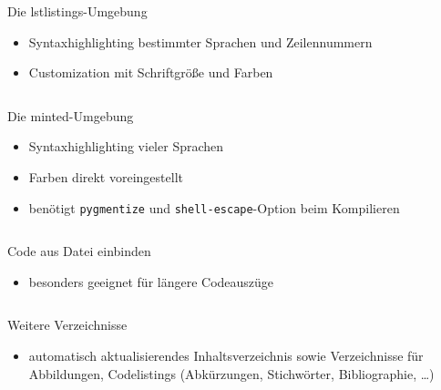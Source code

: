\documentclass[presentation,aspectratio=169]{beamer}
\begin{document}
\begin{frame}[fragile]{Die lstlistings-Umgebung}
  \begin{itemize}
    \item Syntaxhighlighting bestimmter Sprachen und Zeilennummern
    \item Customization mit Schriftgröße und Farben
  \end{itemize}
  \begin{minipage}{.4\textwidth}
    
  \end{minipage}
  \hfill
  \begin{minipage}{.5\textwidth}
    \inputminted{latex}{codebeispiele/listings-lstlistings.tex}
  \end{minipage}
\end{frame}

\begin{frame}[fragile]{Die minted-Umgebung}
  \begin{itemize}
    \item Syntaxhighlighting vieler Sprachen
    \item Farben direkt voreingestellt
    \item benötigt \verb|pygmentize| und \verb|shell-escape|-Option beim Kompilieren
  \end{itemize}
  \begin{minipage}{.4\textwidth}
    
  \end{minipage}
  \hfill
  \begin{minipage}{.5\textwidth}
    \inputminted{latex}{codebeispiele/listings-minted.tex}
  \end{minipage}
\end{frame}

\begin{frame}[fragile]{Code aus Datei einbinden}
  \begin{itemize}
    \item besonders geeignet für längere Codeauszüge
  \end{itemize}
  \begin{minipage}{.4\textwidth}
    
  \end{minipage}
  \hfill
  \begin{minipage}{.5\textwidth}
    \inputminted{latex}{codebeispiele/listings-from-file.tex}
  \end{minipage}
\end{frame}

\begin{frame}[fragile]{Weitere Verzeichnisse}
  \begin{itemize}
    \item automatisch aktualisierendes Inhaltsverzeichnis sowie Verzeichnisse für Abbildungen, Codelistings (Abkürzungen, Stichwörter, Bibliographie, \dots)
  \end{itemize}
  \inputminted{latex}{codebeispiele/list-of-everything.tex}
\end{frame}
\end{document}
